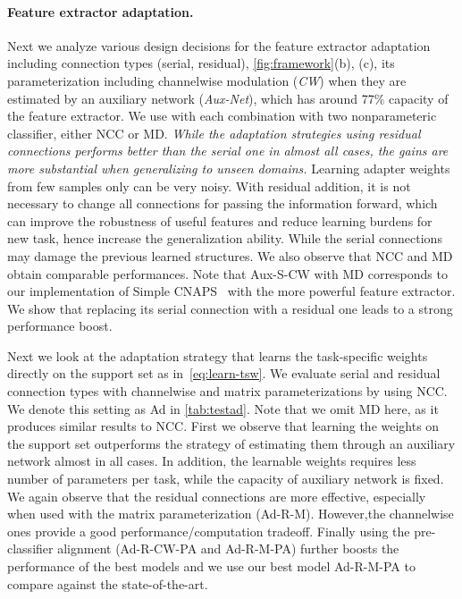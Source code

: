 \paragraph{Feature extractor adaptation.}
Next we analyze various design decisions for the feature extractor adaptation including connection types (serial, residual), \ie \cref{fig:framework}(b), (c), its parameterization including channelwise modulation (\emph{CW}) when they are estimated by an auxiliary network (\emph{Aux-Net}), which has around 77\% capacity of the feature extractor.
We use with each combination with two nonparameteric classifier, either NCC or MD.
\emph{While the adaptation strategies using residual connections performs better than the serial one in almost all cases, the gains are more substantial when generalizing to unseen domains.}
Learning adapter weights from few samples only can be very noisy. With residual addition, it is not necessary to change all connections for passing the information forward, which can improve the robustness of useful features and reduce learning burdens for new task, hence increase the generalization ability. While the serial connections may damage the previous learned structures.
We also observe that NCC and MD obtain comparable performances.
Note that Aux-S-CW with MD corresponds to our implementation of Simple CNAPS~\cite{bateni2020improved} with the more powerful feature extractor.
We show that replacing its serial connection with a residual one leads to a strong performance boost.

Next we look at the adaptation strategy that learns the task-specific weights directly on the support set as in~\cref{eq:learn-tsw}.
We evaluate serial and residual connection types with channelwise and matrix parameterizations by using NCC. 
We denote this setting as Ad in \cref{tab:testad}.
Note that we omit MD here, as it produces similar results to NCC.
First we observe that learning the weights on the support set outperforms the strategy of estimating them through an auxiliary network almost in all cases.
In addition, the learnable weights requires less number of parameters per task, while the capacity of auxiliary network is fixed.
We again observe that the residual connections are more effective, especially when used with the matrix parameterization (Ad-R-M).
However,the channelwise ones provide a good performance/computation tradeoff.
Finally using the pre-classifier alignment (Ad-R-CW-PA and Ad-R-M-PA) further boosts the performance of the best models and we use our best model Ad-R-M-PA to compare against the state-of-the-art.






